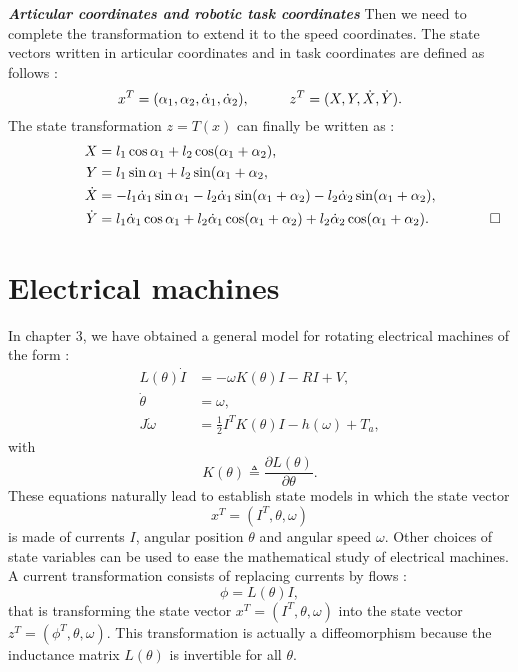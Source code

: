 \begin{exemple}{\bf \em Articular coordinates and robotic task coordinates}
Then we need to complete the transformation to extend it to the speed coordinates. The state vectors written in articular coordinates and in task coordinates are defined as follows : 
$$
x^T = (\alpha_1, \alpha_2, \dot \alpha_1, \dot\alpha_2), \hspace*{10mm} z^T
= (X,Y,\dot X, \dot Y).
$$
The state transformation $z = T(x)$ can finally be written as :
\begin{equation*} \begin{split}
X &= l_1 \cos\alpha_1 + l_2 \cos(\alpha_1 + \alpha_2),\\
Y&= l_1 \sin\alpha_1 + l_2 \sin(\alpha_1 + \alpha_2,\\
\dot X &=-l_1 \dot \alpha_1\sin\alpha_1 -l_2 \dot \alpha_1\sin(\alpha_1+\alpha_2) - l_2 \dot \alpha_2\sin(\alpha_1 + \alpha_2),\\
\dot Y &= l_1 \dot \alpha_1\cos\alpha_1 + l_2 \dot \alpha_1\cos(\alpha_1+\alpha_2) + l_2 \dot \alpha_2\cos(\alpha_1 + \alpha_2). \xqedhere{1.8cm}{\qed}
\end{split} \end{equation*}
\end{exemple}

\section{Electrical machines}

In chapter 3, we have obtained a general model for rotating electrical machines of the form :
\begin{equation*} \begin{split}
L(\theta) \dot I &= -\omega K(\theta) I - RI +V, \\
\dot\theta &= \omega, \label{machel}\\
J \dot \omega &= \frac{1}{2}I^TK(\theta)I - h(\omega) + T_a, 
\end{split} \end{equation*}
with
$$
K(\theta)\triangleq\frac{\partial L(\theta)}{\partial \theta}.
$$
These equations naturally lead to establish state models in which the state vector
$$
x^T = (I^T, \theta, \omega)
$$
is made of currents $I$, angular position $\theta$ and angular speed $\omega$.  Other choices of state variables can be used to ease the mathematical study of electrical machines. A current transformation consists of replacing currents by flows :
$$
\phi = L(\theta)I,
$$
that is transforming the state vector $x^T = (I^T, \theta, \omega)$ into the state vector $z^T = (\phi^T, \theta, \omega)$. This transformation is actually a diffeomorphism because the inductance matrix 
$L(\theta)$ is invertible for all $\theta$.

